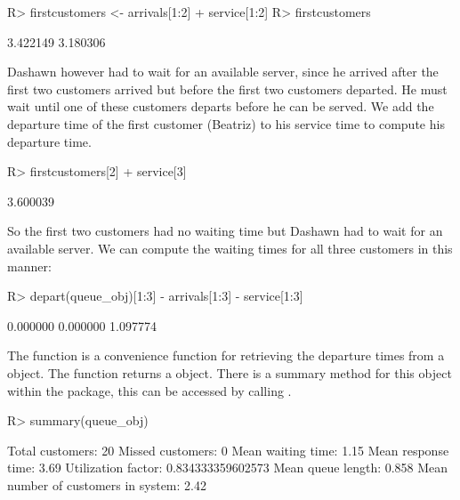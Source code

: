 \documentclass[article]{jss}
\begin{document}
\begin{CodeChunk}
\begin{Sinput}
R> firstcustomers <- arrivals[1:2] + service[1:2]
R> firstcustomers
 \end{Sinput}
 \begin{Soutput}
[1] 3.422149 3.180306
 \end{Soutput}
\end{CodeChunk}

Dashawn however had to wait for an available server, since he arrived after the first two customers arrived but before the first two customers departed. He must wait until one of these customers departs before he can be served. We add the departure time of the first customer (Beatriz) to his service time to compute his departure time.

\begin{CodeChunk}
\begin{Sinput}
R> firstcustomers[2] + service[3]
\end{Sinput}
\begin{Soutput}
[1] 3.600039
\end{Soutput}
\end{CodeChunk}

So the first two customers had no waiting time but Dashawn had to wait for an available server. We can compute the waiting times for all three customers in this manner:

\begin{CodeChunk}
\begin{Sinput}
R> depart(queue_obj)[1:3] - arrivals[1:3] - service[1:3]
\end{Sinput}
\begin{Soutput}
[1] 0.000000 0.000000 1.097774
\end{Soutput}
\end{CodeChunk}

The  function is a convenience function for retrieving the departure times from a  object. The  function returns a  object. There is a summary method for this object within the  package, this can be accessed by calling . 

\begin{CodeChunk}
\begin{Sinput}
R> summary(queue_obj)
\end{Sinput}
\begin{Soutput}
Total customers:
 20
Missed customers:
 0
Mean waiting time:
 1.15
Mean response time:
 3.69
Utilization factor:
 0.834333359602573
Mean queue length:
 0.858
Mean number of customers in system:
 2.42
\end{Soutput}
\end{CodeChunk}
\end{document}
